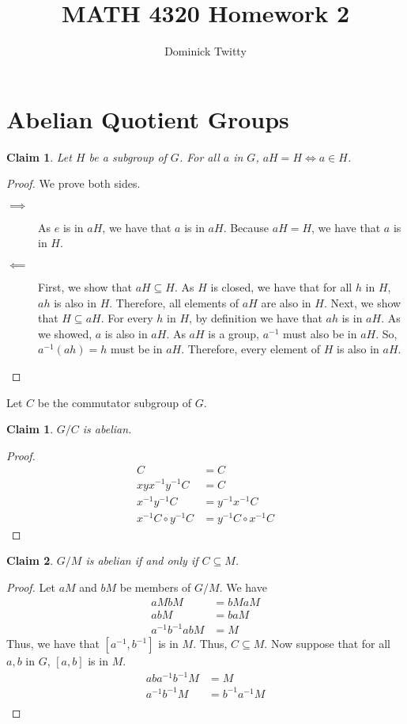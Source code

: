 \documentclass[12pt]{article}
\newtheorem{claim}{Claim}
\newtheorem*{claim*}{Claim}
\newcommand*{\inv}{^{-1}}
\begin{document}
\title{MATH 4320 Homework 2}
\author{Dominick Twitty}
\date{}
\maketitle

\section{Abelian Quotient Groups}
\begin{claim*}
Let $H$ be a subgroup of $G$. For all $a$ in $G$, $aH = H \iff a \in H$.
\end{claim*}
\begin{proof}
We prove both sides.
\begin{description}
\item[$\implies$] As $e$ is in $aH$, we have that $a$ is in $aH$. Because $aH = H$, we have that $a$ is in $H$.
\item[$\impliedby$] First, we show that $aH \subseteq H$. As $H$ is closed, we have that for all $h$ in $H$, $ah$ is also in $H$. Therefore, all elements of $aH$ are also in $H$. Next, we show that $H \subseteq aH$. For every $h$ in $H$, by definition we have that $ah$ is in $aH$. As we showed, $a$ is also in $aH$. As $aH$ is a group, $a\inv$ must also be in $aH$. So, $a\inv (ah) = h$ must be in $aH$. Therefore, every element of $H$ is also in $aH$.
\end{description}
\end{proof}

Let $C$ be the commutator subgroup of $G$.
\begin{claim}
$G / C$ is abelian.
\end{claim}
\begin{proof}
\begin{align*}
[x,y] C &= C\\
xy x\inv y\inv C &= C\\
x\inv y\inv C &= y\inv x\inv C\\
x\inv C \circ y\inv C &= y\inv C \circ x\inv C
\end{align*}
\end{proof}

\begin{claim}
$G / M$ is abelian if and only if $C \subseteq M$.
\end{claim}
\begin{proof}
Let $aM$ and $bM$ be members of $G/M$. We have
\begin{align*}
aMbM &= bMaM\\
abM &= baM\\
a\inv b\inv a b M &= M
\end{align*}
Thus, we have that $[a\inv, b\inv]$ is in $M$. Thus, $C \subseteq M$. Now suppose that for all $a, b$ in $G$, $[a,b]$ is in $M$.
\begin{align*}
ab a\inv b\inv M &= M\\
a\inv b\inv M &= b\inv a\inv M\\
\end{align*}
\end{proof}
\end{document}
